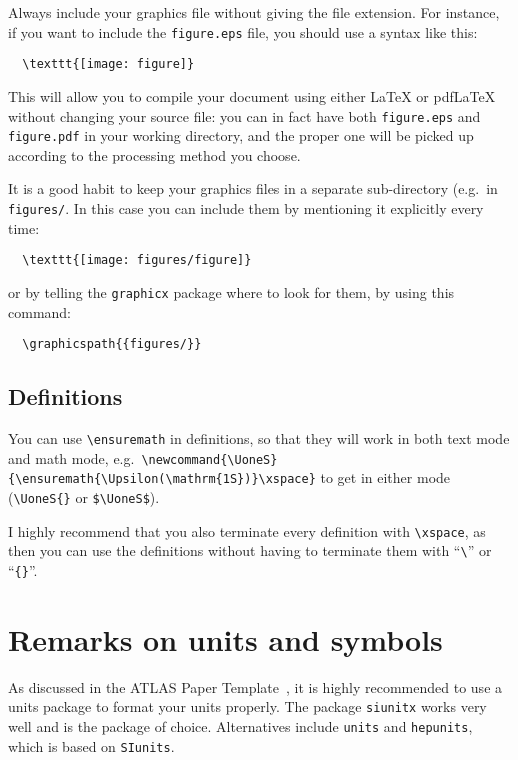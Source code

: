 \documentclass[atlasstyle,UKenglish]{latex/atlasdoc}
\newcommand{\File}[1]{\texttt{#1}\xspace}
\newcommand{\Macro}[1]{\texttt{\textbackslash #1}\xspace}
\newcommand{\Package}[1]{\texttt{#1}\xspace}
\begin{document}
Always include your graphics file without giving the file extension.
For instance, if you want to include the \File{figure.eps}
file, you should use a syntax like this:
\begin{verbatim}
  \texttt{[image: figure]}
\end{verbatim}
This will allow you to compile your document using either \LaTeX{} or
pdf\LaTeX{} without changing your source file: you can in fact have
both \File{figure.eps} and \File{figure.pdf} in your working directory,
and the proper one will be picked up according to the processing method
you choose.

It is a good habit to keep your graphics files in a separate
sub-directory (e.g.\ in \File{figures/}. 
In this case you can include them by mentioning it explicitly every time:
\begin{verbatim}
  \texttt{[image: figures/figure]}
\end{verbatim}
or by telling the \Package{graphicx} package where to look
for them, by using this command:
\begin{verbatim}
  \graphicspath{{figures/}}
\end{verbatim}


\subsection{Definitions}

You can use \verb|\ensuremath| in definitions, so that they will work
in both text mode and math mode, e.g.\
\verb|\newcommand{\UoneS}{\ensuremath{\Upsilon(\mathrm{1S})}\xspace}| to get
\UoneS{} in either mode (\verb|\UoneS{}| or \verb|$\UoneS$|).

I highly recommend that you also terminate every definition with \Macro{xspace},
as then you can use the definitions without having to terminate them with
``\verb|\|'' or ``\verb|{}|''.



\section{Remarks on units and symbols}

As discussed in the ATLAS Paper Template~\cite{atlas-paper},
it is highly recommended to use a units package to format your units properly.
The package \Package{siunitx} works very well and is the package of choice.
Alternatives include \Package{units} and \Package{hepunits},
which is based on \Package{SIunits}.
\end{document}
